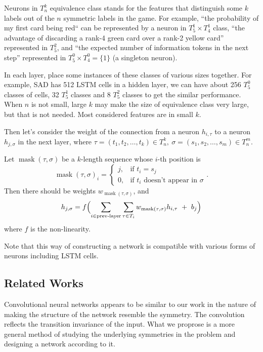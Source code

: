 \documentclass[12pt]{article}
\begin{document}
\begin{spacing}{1.15}
Neurons in $T_n^k$ equivalence class stands for the features that distinguish some $k$ labels out of the $n$ symmetric labels in the game. For example, ``the probability of my first card being red`` can be represented by a neuron in $T_5^1\times T_4^1$ class, ``the advantage of discarding a rank-4 green card over a rank-2 yellow card'' represented in $T_5^2$, and ``the expected number of information tokens in the next step'' represented in $T_5^0\times T_4^0=\{1\}$ (a singleton neuron).

In each layer, place some instances of these classes of various sizes together. For example, SAD has 512 LSTM cells in a hidden layer, we can have about 256 $T_5^0$ classes of cells, 32 $T_5^1$ classes and 8 $T_5^2$ classes to get the similar performance. When $n$ is not small, large $k$ may make the size of equivalence class very large, but that is not needed. Most considered features are in small $k$.

Then let's consider the weight of the connection from a neuron $h_{i,\tau}$ to a neuron $h_{j,\sigma}$ in the next layer, where $\tau = (t_1,t_2,\dots,t_k) \in T_n^k,~\sigma = (s_1,s_2,\dots,s_m) \in T_n^m$.

\newcommand\mask{\mathop{\mathrm{mask}}}
Let $\mask(\tau,\sigma)$ be a $k$-length sequence whose $i$-th position is
\[\mask(\tau,\sigma)_i = \begin{cases}
  j,&\text{if }t_i=s_j \\
  0,&\text{if }t_i\text{ doesn't appear in }\sigma
\end{cases}.\]
Then there should be weights $w_{\mask(\tau,\sigma)}$, and
\[h_{j,\sigma} = f\Bigl(\sum_{i\in\text{prev-layer}}\sum_{\tau\in T_i}w_{\mask(\tau,\sigma)}h_{i,\tau}~+~b_j\Bigr)\]
where $f$ is the non-linearity.

Note that this way of constructing a network is compatible with various forms of neurons including LSTM cells.

\subsection{Related Works}

Convolutional neural networks appears to be similar to our work in the nature of making the structure of the network resemble the symmetry. The convolution reflects the transition invariance of the input. What we proprose is a more general method of studying the underlying symmetries in the problem and designing a network according to it.


\end{spacing}
\end{document}
